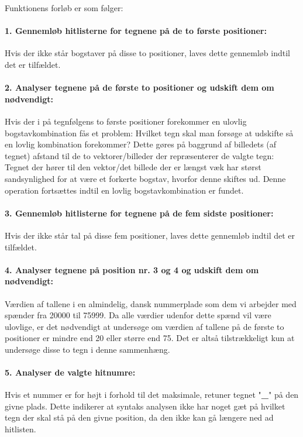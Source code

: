 Funktionens forløb er som følger:

\paragraph{1. Gennemløb hitlisterne for tegnene på de to første positioner:} Hvis der ikke står bogstaver på disse to positioner, laves dette gennemløb indtil det er tilfældet.
\paragraph{2. Analyser tegnene på de første to positioner og udskift dem om nødvendigt:}
Hvis der i på tegnfølgens to første positioner forekommer en ulovlig bogstavkombination fås et problem: Hvilket tegn skal man forsøge at udskifte så en lovlig kombination forekommer? Dette gøres på baggrund af billedets (af tegnet) afstand til de to vektorer/billeder der repræsenterer de valgte tegn: Tegnet der hører til den vektor/det billede der er længst væk har størst sandsynlighed for at være et forkerte bogstav, hvorfor denne skiftes ud. Denne operation fortsættes indtil en lovlig bogstavkombination er fundet.

\paragraph{3. Gennemløb hitlisterne for tegnene på de fem sidste positioner:} Hvis der ikke står tal på disse fem positioner, laves dette gennemløb indtil det er tilfældet.

\paragraph{4. Analyser tegnene på position nr. 3 og 4 og udskift dem om nødvendigt:}
Værdien af tallene i en almindelig, dansk nummerplade som dem vi arbejder med spænder fra 20000 til 75999. Da alle værdier udenfor dette spænd vil være ulovlige, er det nødvendigt at undersøge om værdien af tallene på de første to positioner er mindre end 20 eller større end 75. Det er altså tilstrækkeligt kun at undersøge disse to tegn i denne sammenhæng.

\paragraph{5. Analyser de valgte hitnumre:} Hvis et nummer er for højt i forhold til det maksimale, retuner tegnet "\textbf{\_}" på den givne plads. Dette indikerer at syntaks analysen ikke har noget gæt på hvilket tegn der skal stå på den givne position, da den ikke kan gå længere ned ad hitlisten.

